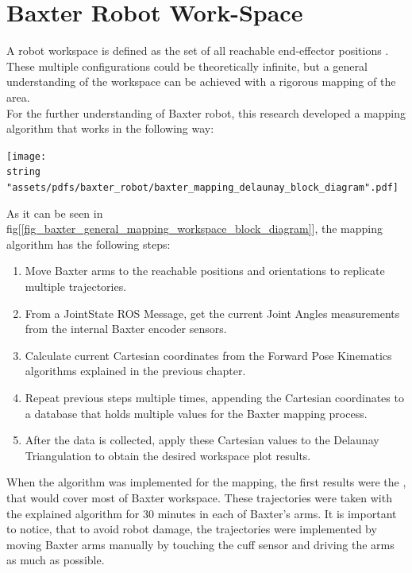 \documentclass[11pt]{report} %
\begin{document}
\section{Baxter Robot Work-Space}

A robot workspace is defined as the set of all reachable end-effector positions \citep{cite_robot_academy}. These multiple configurations could be theoretically infinite, but a general understanding of the workspace can be achieved with a rigorous mapping of the area.\\

For the further understanding of Baxter robot, this research developed a mapping algorithm that works in the following way:

\begin{center}
\texttt{[image: \\string "assets/pdfs/baxter\_robot/baxter\_mapping\_delaunay\_block\_diagram".pdf]}
\bigbreak
\begin{minipage}{\linewidth} %
\label{fig_baxter_general_mapping_workspace_block_diagram}
\end{minipage} \end{center}

As it can be seen in fig[\ref{fig_baxter_general_mapping_workspace_block_diagram}], the mapping algorithm has the following steps:

\begin{enumerate}
    \item Move Baxter arms to the reachable positions and orientations to replicate multiple trajectories.
    \item From a JointState ROS Message, get the current Joint Angles measurements from the internal Baxter encoder sensors.
    \item Calculate current Cartesian coordinates from the Forward Pose Kinematics algorithms explained in the previous chapter.
    \item Repeat previous steps multiple times, appending the Cartesian coordinates to a database that holds multiple values for the Baxter mapping process.
    \item After the data is collected, apply these Cartesian values to the Delaunay Triangulation to obtain the desired workspace plot results.
\end{enumerate}

When the algorithm was implemented for the mapping, the first results were the , that would cover most of Baxter workspace. These trajectories were taken with the explained algorithm for 30 minutes in each of Baxter's arms. It is important to notice, that to avoid robot damage, the trajectories were implemented by moving Baxter arms manually by touching the cuff sensor and driving the arms as much as possible.\\
\end{document}
